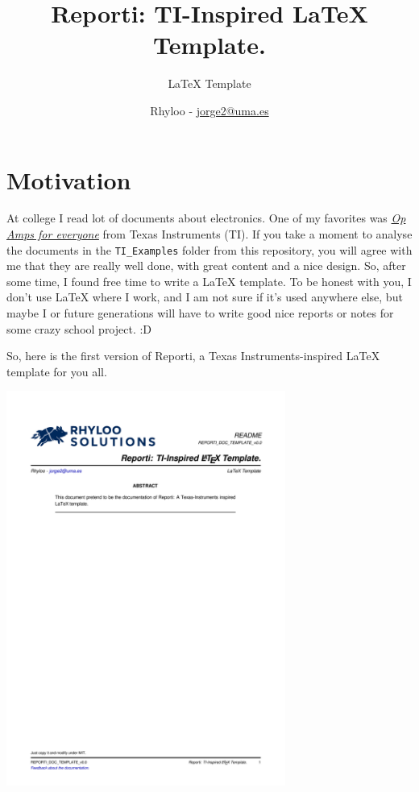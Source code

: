\documentclass[english]{reporti}
\date{}
\title{Reporti: TI-Inspired \LaTeX{} Template.}
\begin{document}
\subtitle{LaTeX Template}
\author{Rhyloo - \href{mailto:jorge2@uma.es}{jorge2@uma.es}}




\cover[width=1.35\textwidth][next]

\section{Motivation}
\label{sec:orgb0a38fc}
At college I read lot of documents about electronics. One of my favorites was \emph{\href{https://e2echina.ti.com/cfs-file/\_\_key/telligent-evolution-components-attachments/00-52-01-00-00-04-59-46/OP-amp-for-everyone.pdf}{Op Amps for everyone}} from Texas Instruments (TI). If you take a moment to analyse the documents in the \texttt{TI\_Examples} folder from this repository, you will agree with me that they are really well done, with great content and a nice design. So, after some time, I found free time to write a \LaTeX{} template. To be honest with you, I don't use \LaTeX{} where I work, and I am not sure if it's used anywhere else, but maybe I or future generations will have to write good nice reports or notes for some crazy school project. :D

So, here is the first version of Reporti, a Texas Instruments-inspired \LaTeX{} template for you all.

\begin{center}
\includegraphics[fbox,height=35em]{./README.pdf}
\end{center}
\end{document}
